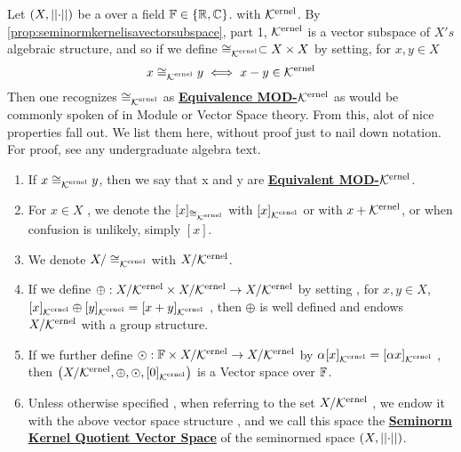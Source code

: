\label{def:equivalencemodseminormkernel}
\newcommand{\EquivelanceModKernel}[0]{\textbf{\hyperref[def:equivalencemodseminormkernel]{Equivalence MOD-$\Ker$}}\xspace}
\newcommand{\EquivalenceModKernel}[0]{\textbf{\hyperref[def:equivalencemodseminormkernel]{Equivalence MOD-$\Ker$}}\xspace}
\newcommand{\EquivalentModKernel}[0]{\textbf{\hyperref[def:equivalencemodseminormkernel]{Equivalent MOD-$\Ker$}}\xspace}
\newcommand{\SeminormKernelQuotientVectorSpace}[0]{\textbf{\hyperref[def:equivalencemodseminormkernel]{Seminorm Kernel Quotient Vector Space}}\xspace}

\begin{df}
Let $(X,\norm{\cdot})$ be a \SeminormedSpace over a field $\F \in \{\R,\C\}$.
with \SeminormKernel $\Ker$.
By \ref{prop:seminormkernelisavectorsubspace}, part 1, 
$\Ker$ is a vector subspace of $X's$ algebraic structure, and so if we define 
$\cong_{\Ker} \subset X \times X$ by setting, for $x,y \in X$
\begin{equation}
x \cong_{\Ker} y \iff x-y \in \Ker
\end{equation}
Then one recognizes $\cong_{\Ker}$ as \EquivelanceModKernel as would be commonly spoken of in Module or Vector Space theory. 
From this, alot of nice properties fall out. We list them here, without proof just to nail down notation. 
For proof, see any undergraduate algebra text.
\begin{enumerate}
\item If $x \cong_{\Ker} y$, then we say that x and y are \EquivalentModKernel. 
\item For $x \in X$
    , we denote the \EquivalenceClass $[x]_{\cong_{\Ker}}$ with 
    $[x]_{\Ker}$ or 
    with $x+\Ker$, or 
    when confusion is unlikely, simply $[x]$. 
\item We denote $X/\cong_{\Ker}$ with $X/\Ker$. 
\item If we define $\oplus:X/\Ker \times X/\Ker \to X/\Ker$ by setting
    , for $x,y \in X$, $[x]_{\Ker}\oplus[y]_{\Ker}=[x+y]_{\Ker}$
    , then $\oplus$ is well defined and endows $X/\Ker$ with a group structure. 
\item If we further define $\odot:\F \times X/\Ker \to X/\Ker$ by 
    $\alpha [x]_{\Ker}=[\alpha x]_{\Ker}$
    , then $\pa{X/\Ker, \oplus, \odot, [0]_{\Ker}}$ is a Vector space over $\F$. 
\item Unless otherwise specified
    , when referring to the set $X/\Ker$
    , we endow it with the above vector space structure
    , and we call this space the \SeminormKernelQuotientVectorSpace 
    of the seminormed space $(X, \norm{\cdot})$.
\end{enumerate}
\end{df}

